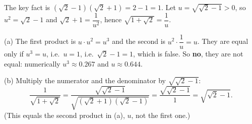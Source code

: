 The key fact is $\left(\sqrt2-1\right)\left(\sqrt2+1\right)=2-1=1$. Let $u=\sqrt{\sqrt2-1}>0$, so $u^2=\sqrt2-1$ and $\sqrt2+1=\dfrac{1}{u^2}$, hence $\sqrt{1+\sqrt2}=\dfrac{1}{u}$.

(a) The first product is $u\cdot u^2=u^3$ and the second is $u^2\cdot\dfrac{1}{u}=u$. They are equal only if $u^3=u$, i.e.\ $u=1$, i.e.\ $\sqrt2-1=1$, which is false. So \textbf{no}, they are not equal: numerically $u^3\approx0.267$ and $u\approx0.644$.

(b) Multiply the numerator and the denominator by $\sqrt{\sqrt2-1}$:
\[
\dfrac{1}{\sqrt{1+\sqrt2}}=\dfrac{\sqrt{\sqrt2-1}}{\sqrt{\left(\sqrt2+1\right)\left(\sqrt2-1\right)}}=\dfrac{\sqrt{\sqrt2-1}}{1}=\boxed{\sqrt{\sqrt2-1}}.
\]
(This equals the second product in (a), $u$, not the first one.)
